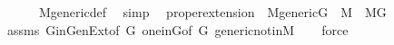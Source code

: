 \begin{isabellebody}
\ \ \ \ \ \ M{\isacharunderscore}{\kern0pt}generic{\isacharunderscore}{\kern0pt}def\ \isamarkupfalse%
\ simp\ %
\isanewline
{}\isamarkupfalse%
%
\endisatagproof
{\isafoldproof}%
%
\isadelimproof
\isanewline
%
\endisadelimproof
\isanewline
{}\isamarkupfalse%
\ proper{\isacharunderscore}{\kern0pt}extension{\isacharcolon}{\kern0pt}\ \ {\isachardoublequoteopen}M{\isacharunderscore}{\kern0pt}generic{\isacharparenleft}{\kern0pt}G{\isacharparenright}{\kern0pt}{\isachardoublequoteclose}\ \ {\isachardoublequoteopen}M\ {\isasymnoteq}\ M{\isacharbrackleft}{\kern0pt}G{\isacharbrackright}{\kern0pt}{\isachardoublequoteclose}\isanewline
%
\isadelimproof
\ \ %
\endisadelimproof
%
\isatagproof
{}\isamarkupfalse%
\ assms\ G{\isacharunderscore}{\kern0pt}in{\isacharunderscore}{\kern0pt}Gen{\isacharunderscore}{\kern0pt}Ext{\isacharbrackleft}{\kern0pt}of\ G{\isacharbrackright}{\kern0pt}\ one{\isacharunderscore}{\kern0pt}in{\isacharunderscore}{\kern0pt}G{\isacharbrackleft}{\kern0pt}of\ G{\isacharbrackright}{\kern0pt}\ generic{\isacharunderscore}{\kern0pt}not{\isacharunderscore}{\kern0pt}in{\isacharunderscore}{\kern0pt}M\isanewline
\ \ \isamarkupfalse%
\ force%
\endisatagproof
{\isafoldproof}%
%
\isadelimproof
\isanewline
%
\endisadelimproof
\isanewline
{}\isamarkupfalse%
\ \isanewline
%
\isadelimtheory
\isanewline
%
\endisadelimtheory
%
\isatagtheory
{}\isamarkupfalse%
%
\endisatagtheory
{\isafoldtheory}%
%
\isadelimtheory
%
\endisadelimtheory
%
\end{isabellebody}%
\endinput
